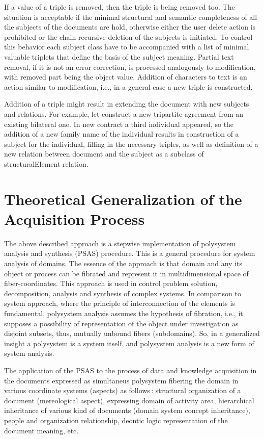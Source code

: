 \documentclass[utf8]{../IncArticle}
\begin{document}
If a value of a triple is removed, then the triple is being removed too. The situation is acceptable if the minimal structural and semantic completeness of all the subjects of the documents are hold, otherwise either the user delete action is prohibited or the chain recursive deletion of the subjects is initiated. To control this behavior each subject class have to be accompanied with a list of minimal valuable triplets that define the basis of the subject meaning. Partial text removal, if it is not an error correction, is processed analogously to modification, with removed part being the object value. Addition of characters to text is an action similar to modification, i.e., in a general case a new triple is constructed.

Addition of a triple might result in extending the document with new subjects and relations. For example, let construct a new tripartite agreement from an existing bilateral one. In new contract a third individual appeared, so the addition of a new family name of the individual results in construction of a subject for the individual, filling in the necessary triples, as well as definition of a new relation between document and the subject as a subclass of structuralElement relation.

\section{Theoretical Generalization of the Acquisition Process}

The above described approach is a stepwise implementation of polysystem analysis and synthesis \cite{father} (PSAS) procedure. This is a general procedure for system analysis of domains. The essence of the approach is that domain and any its object or process can be fibrated and represent it in multidimensional space of fiber-coordinates. This approach is used in control problem solution, decomposition, analysis and synthesis of complex systems. In comparison to system approach, where the principle of interconnection of the elements is fundamental, polysystem analysis assumes the hypothesis of fibration, i.e., it supposes a possibility of representation of the object under investigation as disjoint subsets, thus, mutually unbound fibers (subdomains). So, in a generalized insight a polysystem is a system itself, and polysystem analysis is a new form of system analysis.

The application of the PSAS to the process of data and knowledge acquisition in the documents expressed as simultaneus polysystem fibering the domain in various coordinate systems (aspects) as follows\,: structural organization of a document (mereological aspect), expressing domain of activity area, hierarchical inheritance of various kind of documents (domain system concept inheritance), people and organization relationship, deontic logic representation of the document meaning, etc.
\end{document}

